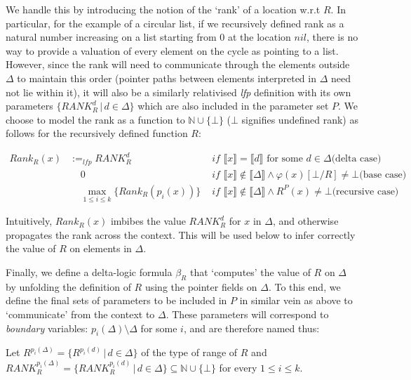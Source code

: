 We handle this by introducing the notion of the `rank' of a location w.r.t $R$. In particular, for the example of a circular list, if we recursively defined rank as a natural number increasing on a list starting from $0$ at the location $nil$, there is no way to provide a valuation of every element on the cycle as pointing to a list. However, since the rank will need to communicate through the elements outside $\Delta{}$ to maintain this order (pointer paths between elements interpreted in $\Delta{}$ need not lie within it), it will also be a similarly relativised \textit{lfp} definition with its own parameters $\{\textit{RANK}_{R}^{d} \,|\, d \in{} \Delta{} \}$ which are also included in the parameter set $P$. We choose to model the rank as a function to $\mathbb{N} \cup{} \{\bot{}\}$ ($\bot{}$ signifies undefined rank) as follows for the recursively defined function $R$:

\vspace*{-0.5cm}
\begin{align*}
Rank_{R}(x) & :=_\textit{lfp} \textit{RANK}_{R}^{d} & \textit{ if } \llbracket{}x\rrbracket{} = \llbracket{}d\rrbracket{} \textrm{ for some } d \in{}\Delta{} \textrm{(delta case)}\\
& ~~~~~ 0 & \textit{ if } \llbracket{}x\rrbracket{} \notin{} \llbracket{}\Delta{}\rrbracket{} \land{} \varphi(x)[\bot{}/R] \neq{} \bot{} \textrm{(base case)}\\
& ~~~~~ \max\limits_{1 \leq{} i \leq{} k}\{Rank_{R}(p_i(x))\} & \textit{ if } \llbracket{}x\rrbracket{} \notin{} \llbracket{}\Delta{}\rrbracket{} \land{} R^{P}(x) \neq{} \bot{} \textrm{(recursive case)}
\end{align*}

Intuitively, $Rank_{R}(x)$ imbibes the value $RANK_{R}^{d}$ for $x$ in $\Delta{}$, and otherwise propagates the rank across the context. This will be used below to infer correctly the value of $R$ on elements in $\Delta{}$. 

Finally, we define a delta-logic formula $\beta_{R}$ that `computes' the value of $R$ on $\Delta$ by unfolding the definition of $R$ using the pointer fields on $\Delta{}$. To this end, we define the final sets of parameters to be included in $P$ in similar vein as above to `communicate' from the context to $\Delta$. These parameters will correspond to \emph{boundary} variables: $p_i(\Delta{}) \setminus{} \Delta{}$ for some $i$, and are therefore named thus:

Let $R^{p_i(\Delta)} = \{ R^{p_i(d)} \,|\, d \in{} \Delta{} \}$ of the type of range of $R$ and $\textit{RANK}_{R}^{p_i(\Delta)} = \{ \textit{RANK}_{R}^{p_i(d)} \,|\, d \in{} \Delta{} \} \subseteq{} \mathbb{N} \cup{} \{\bot{}\}$ for every $1\leq{} i \leq{}k$.


